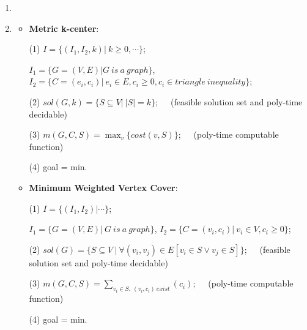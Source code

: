 \documentclass[12pt,a4paper]{article}
\makeatletter
\newtheorem*{solution}{Solution}
\theoremstyle{definition}
\renewenvironment{solution}[1][Solution] {\par\pushQED{\qed}\normalfont\topsep6\p@\@plus6\p@\relax\trivlist\item[\hskip\labelsep\bfseries#1\@addpunct{.}]\ignorespaces}{\popQED\endtrivlist\@endpefalse} \makeatother
\makeatother
\begin{document}
\begin{enumerate}
    \begin{solution}\item
    \renewcommand{\qedsymbol}{}
    \begin{itemize}
    \item 
    \textbf{Metric k-center}:\par
    (1) $I=\{(I_1, I_2,k)|\ k\geq 0, \cdots\}$;\par
    $I_1 = \{G = (V,E) |G\ is\ a\ graph\}$, $I_2 = \{C = (e_i,c_i) |\ e_i\in E, c_i\geq 0, c_i\in triangle\ inequality\}$;\par
    (2) $sol(G, k)=\{S \subseteq V|\ |S| = k\}$;\ \ \ (feasible solution set and poly-time decidable)\par
    (3) $m(G, C, S) = \max_v\{cost(v, S)\}$;\ \ \ (poly-time computable function)\par
    (4) goal = min.
    \item 
    \textbf{Minimum Weighted Vertex Cover}:\par
    (1) $I=\{(I_1, I_2)| \cdots\}$;\par $I_1 = \{G = (V,E) |\ G\ is\ a\ graph\}$, $I_2 = \{C = (v_i,c_i) |\ v_i\in V, c_i\geq 0 \}$;\par
    (2) $sol(G)=\{S\subseteq V\ |\ \forall(v_i,v_j)\in E[v_i \in S \vee v_j\in S]\}$;\ \ \ (feasible solution set and poly-time decidable)\par
    (3) $m(G, C, S) = \sum_{v_i\in S,\ (v_i,c_i)\ exist}(c_i) $;\ \ \ (poly-time computable function)\par
    (4) goal = min.
    \end{itemize}
    \end{solution}

\end{enumerate}

\vspace{20pt}



\end{document}
